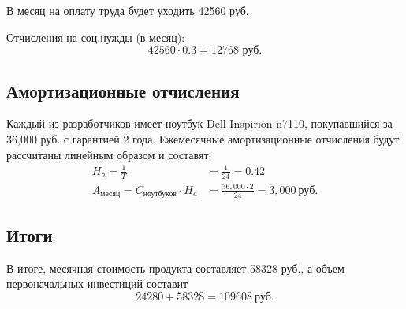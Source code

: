 	В месяц на оплату труда будет уходить 42560 руб.
	
	Отчисления на соц.нужды (в месяц):
	\[
		42560 \cdot 0.3 = 12768 \text{\ руб.}
	\]
\subsection{Амортизационные отчисления}
	Каждый из разработчиков имеет ноутбук Dell Inspirion n7110, покупавшийся за 36,000 руб. с гарантией 2 года.  Ежемесячные амортизационные отчисления будут рассчитаны линейным образом и составят:
	\begin{align}
		H_{a} = \frac{1}{T} &= \frac{1}{24} = 0.42 \\
		A_{\text{месяц}} = C_{\text{ноутбуков}} \cdot H_a &= \frac {36,000 \cdot 2}{24} = 3,000\ \text{руб.}
	\end{align}
	
\subsection{Итоги} \label{subseq:production_plan_results}
	В итоге, месячная стоимость продукта составляет 58328 руб., а объем первоначальных инвестиций составит 
	\[
		24280 + 58328 = 109608\ \text{руб.}
	\]
